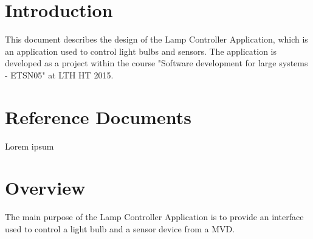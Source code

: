 \documentclass[a4paper]{article}
\begin{document}
	
	\tableofcontents
	\newpage
	
	\section{Introduction}
	This document describes the design of the Lamp Controller Application, which is an application used to control light bulbs and sensors. The application is developed as a project within the course "Software development for large systems - ETSN05" at LTH HT 2015.
	
	\section{Reference Documents}
	Lorem ipsum
	
	
	\section{Overview}
	The main purpose of the Lamp Controller Application is to provide an interface used to control a light bulb and a sensor device from a MVD. 
	
\end{document}
